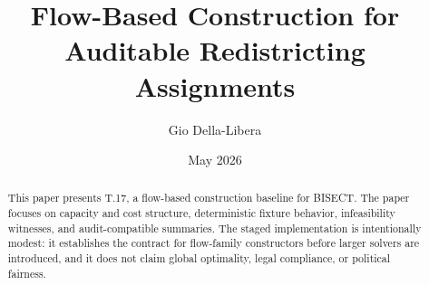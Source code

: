 \documentclass[12pt]{article}
\title{Flow-Based Construction for Auditable Redistricting Assignments}
\author{Gio Della-Libera}
\date{May 2026}
\begin{document}
\maketitle

\begin{abstract}
This paper presents T.17, a flow-based construction baseline for BISECT. The
paper focuses on capacity and cost structure, deterministic fixture behavior,
infeasibility witnesses, and audit-compatible summaries. The staged
implementation is intentionally modest: it establishes the contract for
flow-family constructors before larger solvers are introduced, and it does not
claim global optimality, legal compliance, or political fairness.
\end{abstract}









\nocite{bisect-t17-spec}


\end{document}
